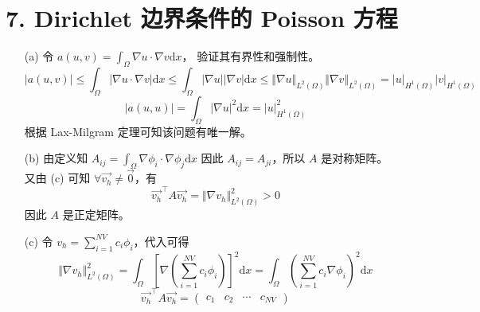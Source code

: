 \documentclass[a4paper]{article}
\begin{document}
\section*{7. Dirichlet 边界条件的 Poisson 方程}

\begin{enumerate}
    \item[(a)] 令 $a(u,v)=\int_{\Omega}\nabla u \cdot \nabla v \text{d}x$，
                验证其有界性和强制性。
            \begin{equation}
                |a(u,v)|
                \leq \int_{\Omega} |\nabla u \cdot \nabla v| \text{d}x
                \leq \int_{\Omega} |\nabla u| |\nabla v| \text{d}x
                \leq \Vert \nabla u \Vert_{L^2(\Omega)}
                    \Vert \nabla v \Vert_{L^2(\Omega)}
                = |u|_{H^1(\Omega)}
                    |v|_{H^1(\Omega)}
            \end{equation}
            \begin{equation}
                |a(u,u)|
                = \int_{\Omega} |\nabla u|^2 \text{d}x
                = |u|_{H^1(\Omega)}^2
            \end{equation}
            根据 Lax-Milgram 定理可知该问题有唯一解。
    \item[(b)] 由定义知 $A_{ij} = \int_{\Omega} \nabla \phi_i \cdot \nabla \phi_j \text{d}x$ 
    因此 $A_{ij} = A_{ji}$，所以 $A$ 是对称矩阵。\\
    又由 (c) 可知 $\forall \vec{v_h} \neq \vec{0}$，有
    \begin{equation}
        \vec{v_h}^\top A \vec{v_h}
        = \Vert \nabla v_h \Vert^2_{L^2(\Omega)} > 0
    \end{equation}
    因此 $A$ 是正定矩阵。
    \item[(c)] 令 $v_h = \sum_{i=1}^{NV}c_i \phi_i$，代入可得
            \begin{equation}
                \Vert \nabla v_h \Vert^2_{L^2(\Omega)}
                = \int_{\Omega} 
                    \left[\nabla \left(\sum_{i=1}^{NV}c_i \phi_i\right)\right]^2 \text{d}x
                = \int_{\Omega} 
                    \left( \sum_{i=1}^{NV}c_i \nabla \phi_i \right)^2 \text{d}x
            \end{equation}
            \begin{equation}
                \vec{v_h}^\top A\vec{v_h}
                =
                \begin{pmatrix}
                    c_1 & c_2 & \cdots & c_{NV}
                \end{pmatrix}

\end{equation}
\end{enumerate}
\end{document}
